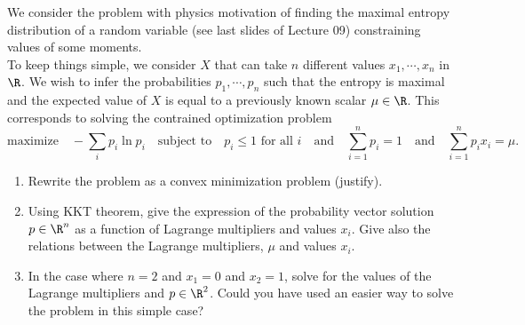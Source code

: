 \documentclass[11pt,nocut]{article}
\begin{document}
\vspace{5mm}

\begin{problem}[$\star$]
	We consider the problem with physics motivation of finding the maximal entropy distribution of a random variable (see last slides of Lecture 09)  constraining values of some moments. \\
	

	To keep things simple, we consider $X$ that can take $n$ different values $x_1, \cdots, x_n$ in $\R$. We wish to infer the probabilities $p_1, \cdots, p_n$ such that the entropy is maximal and the expected value of $X$ is equal to a previously known scalar $\mu \in \R$. This corresponds to solving the contrained optimization problem
	\begin{equation}\label{eq:eig3}
		\text{maximize} \quad - \sum_i p_i \ln p_i \quad \text{subject to} \quad p_i \leq 1 \text{ for all } i
		\quad \text{and} \quad \sum_{i=1}^n p_i = 1
		\quad \text{and} \quad \sum_{i=1}^n p_i x_i = \mu.
	\end{equation}
	\begin{enumerate}[label=\normalfont(\textbf{\alph*})]
		\item Rewrite the problem as a convex minimization problem (justify).
		\item Using KKT theorem, give the expression of the probability vector solution $p \in \R^n$ as a function of Lagrange multipliers and values $x_i$. Give also the relations between the Lagrange multipliers, $\mu$ and values $x_i$.
		\item In the case where $n=2$ and $x_1=0$ and $x_2=1$, solve for the values of the Lagrange multipliers and $p \in \R^2$. Could you have used an easier way to solve the problem in this simple case?

	\end{enumerate}

\end{problem}



%
%
\end{document}

